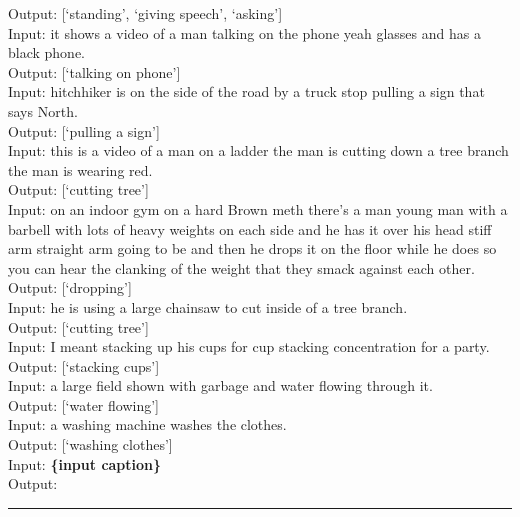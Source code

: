 {Output: [`standing', `giving speech', `asking'] \\
Input: it shows a video of a man talking on the phone yeah glasses and has a black phone. \\
Output: [`talking on phone'] \\
Input: hitchhiker is on the side of the road by a truck stop pulling a sign that says North. \\
Output: [`pulling a sign'] \\
Input: this is a video of a man on a ladder the man is cutting down a tree branch the man is wearing red. \\
Output: [`cutting tree'] \\
Input: on an indoor gym on a hard Brown meth there's a man young man with a barbell with lots of heavy weights on each side and he has it over his head stiff arm straight arm going to be and then he drops it on the floor while he does so you can hear the clanking of the weight that they smack against each other. \\
Output: [`dropping'] \\
Input: he is using a large chainsaw to cut inside of a tree branch. \\
Output: [`cutting tree'] \\
Input: I meant stacking up his cups for cup stacking concentration for a party. \\
Output: [`stacking cups'] \\
Input: a large field shown with garbage and water flowing through it. \\
Output: [`water flowing'] \\
Input: a washing machine washes the clothes. \\
Output: [`washing clothes'] \\
Input: \textbf{\{input caption\}}\\
Output: \\}
\noindent\rule{8.5cm}{0.4pt}

